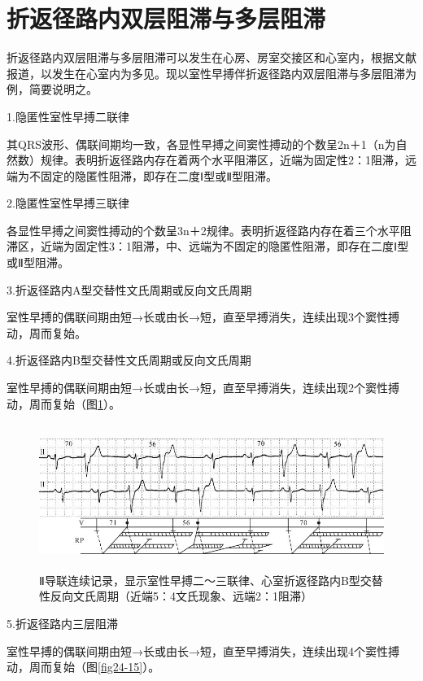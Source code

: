 \protect\hypertarget{text00031.htmlux5cux23subid370}{}{}

\section{折返径路内双层阻滞与多层阻滞}

折返径路内双层阻滞与多层阻滞可以发生在心房、房室交接区和心室内，根据文献报道，以发生在心室内为多见。现以室性早搏伴折返径路内双层阻滞与多层阻滞为例，简要说明之。

1.隐匿性室性早搏二联律

其QRS波形、偶联间期均一致，各显性早搏之间窦性搏动的个数呈2n＋1（n为自然数）规律。表明折返径路内存在着两个水平阻滞区，近端为固定性2：1阻滞，远端为不固定的隐匿性阻滞，即存在二度Ⅰ型或Ⅱ型阻滞。

2.隐匿性室性早搏三联律

各显性早搏之间窦性搏动的个数呈3n＋2规律。表明折返径路内存在着三个水平阻滞区，近端为固定性3：1阻滞，中、远端为不固定的隐匿性阻滞，即存在二度Ⅰ型或Ⅱ型阻滞。

3.折返径路内A型交替性文氏周期或反向文氏周期

室性早搏的偶联间期由短→长或由长→短，直至早搏消失，连续出现3个窦性搏动，周而复始。

4.折返径路内B型交替性文氏周期或反向文氏周期

室性早搏的偶联间期由短→长或由长→短，直至早搏消失，连续出现2个窦性搏动，周而复始（图\ref{fig24-14}）。

\begin{figure}[!htbp]
 \centering
 \includegraphics[width=5.5625in,height=1.86458in]{./images/Image00409.jpg}
 \captionsetup{justification=centering}
 \caption{Ⅱ导联连续记录，显示室性早搏二～三联律、心室折返径路内B型交替性反向文氏周期（近端5：4文氏现象、远端2：1阻滞）}
 \label{fig24-14}
  \end{figure} 

5.折返径路内三层阻滞

室性早搏的偶联间期由短→长或由长→短，直至早搏消失，连续出现4个窦性搏动，周而复始（图\ref{fig24-15}）。

